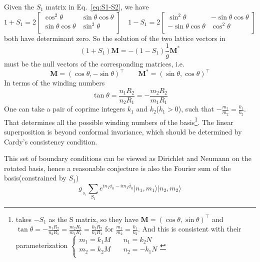 \documentclass{article}
\renewcommand{\vec}[1]{\boldsymbol{\mathbf{#1}}}
\begin{document}
Given the $S_1$ matrix in Eq.~\eqref{eq:S1-S2}, we have
\begin{equation}
1 + S_1 = 2  
\begin{bmatrix}
\cos^2 \theta & \sin \theta \cos\theta \\
\sin \theta \cos \theta  & \sin^2 \theta \\
\end{bmatrix}
\quad 
1 - S_1 = 2
\begin{bmatrix}
\sin^2 \theta & -\sin \theta \cos\theta \\
-\sin \theta \cos \theta  & \cos^2 \theta \\
\end{bmatrix}
\end{equation}
both have determinant zero. So the solution of the two lattice vectors in 
\begin{equation}
( 1 + S_1) \vec{M} = -( 1 - S_1 ) \frac{1}{g} \vec{M}^*
\end{equation}
must be the null vectors of the corresponding matrices, i.e. 
\begin{equation}
\vec{M} = ( \cos \theta, -\sin \theta )^\top \qquad \vec{M}^{*} = ( \sin \theta, \cos \theta )^\top 
\end{equation}
In terms of the winding numbers
\begin{equation}
  \tan \theta =  \frac{n_1 R_2}{n_2 R_1 } = -\frac{m_2 R_2}{ m_1 R_1}
\end{equation}
One can take a pair of coprime integers $k_1$ and $k_2$($k_1>0$), such that $-\frac{m_1}{m_2} = \frac{k_1}{k_2}$. That determines all the possible winding numbers of the basis\footnote{\cite{bachas_fusion_2008} takes $-S_1$ as the S matrix, so they have $\vec{M} = ( \cos \theta, \sin \theta)^\top $ and $\tan \theta = -\frac{n_1 R_2}{n_2 R_1 } = \frac{m_2 R_2}{ m_1 R_1} = \frac{k_2 R_2}{k_1 R_1}$ for $\frac{m_1}{m_2} = \frac{k_1}{k_2}$. And this is consistent with their parameterization  $ \left\lbrace
  \begin{aligned}
    m_1 = k_1 M  & \quad n_1 = k_2 N  \\
    m_2 = k_2 M &  \quad n_2 = -k_1 N \\
  \end{aligned} \right. $ }. The linear superposition is beyond conformal invariance, which should be determined by Cardy's consistency condition. 

This set of boundary conditions can be viewed as Dirichlet and Neumann on the rotated basis, hence a reasonable conjecture is also the Fourier sum of the basis(constrained by $S_1$)
\begin{equation}
g_{\,\!_{S_1}} \sum_{S_1} e^{i n_1 \phi_0 - i m_1 \bar{\phi}_0 } | n_1, m_1  \rangle | n_2, m_2  \rangle 
\end{equation}
\end{document}
